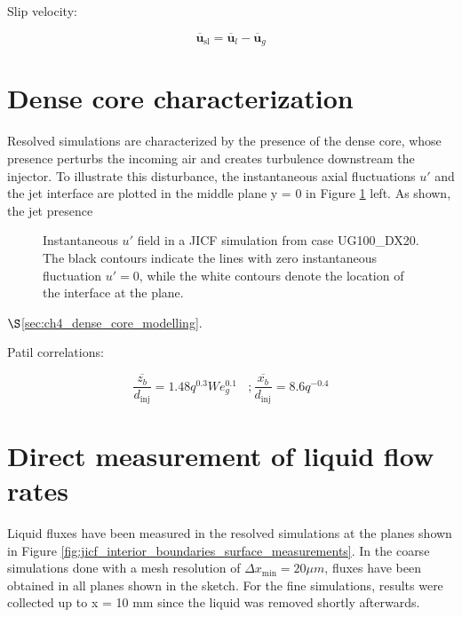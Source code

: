 Slip velocity:

\begin{equation}
\overline{\textbf{u}}_{\mathrm{sl}} = \overline{\textbf{u}}_l - \overline{\textbf{u}}_g
\end{equation}

\clearpage

\section{Dense core characterization}
\label{subsec:ch5_dense_core_in_ACLS_simus}

Resolved simulations are characterized by the presence of the dense core, whose presence perturbs the incoming air and creates turbulence downstream the injector. To illustrate this disturbance, the instantaneous axial fluctuations $u'$ and the jet interface are plotted in the middle plane y = 0 in Figure \ref{fig:results_dense_core_modeling_up_field} left. As shown, the jet presence

\begin{figure}[ht]
\centering
{}
\caption[Perturbation effect of the liquid dense core in the gaseous field.]{Instantaneous $u'$ field in a JICF simulation from case UG100\_DX20. The black contours indicate the lines with zero instantaneous fluctuation $u' = 0$, while the white contours denote the location of the interface at the plane.}
\label{fig:results_dense_core_modeling_up_field}
\end{figure}



$\S$\ref{sec:ch4_dense_core_modelling}.

Patil correlations:

\begin{equation}
\frac{\overline{z_b}}{d_\mathrm{inj}} = 1.48 q^{0.3} We_g^{0.1} ~~~~; \frac{\overline{x_b}}{d_\mathrm{inj}} = 8.6 q^{-0.4}
\end{equation}

\section{Direct measurement of liquid flow rates}

Liquid fluxes have been measured in the resolved simulations at the planes shown in Figure \ref{fig:jicf_interior_boundaries_surface_measurements}. In the coarse simulations done with a mesh resolution of $\Delta x_\mathrm{min} = 20 \mu m$, fluxes have been obtained in all planes shown in the sketch. For the fine simulations, results were collected up to x = 10 mm since the liquid was removed shortly afterwards.

